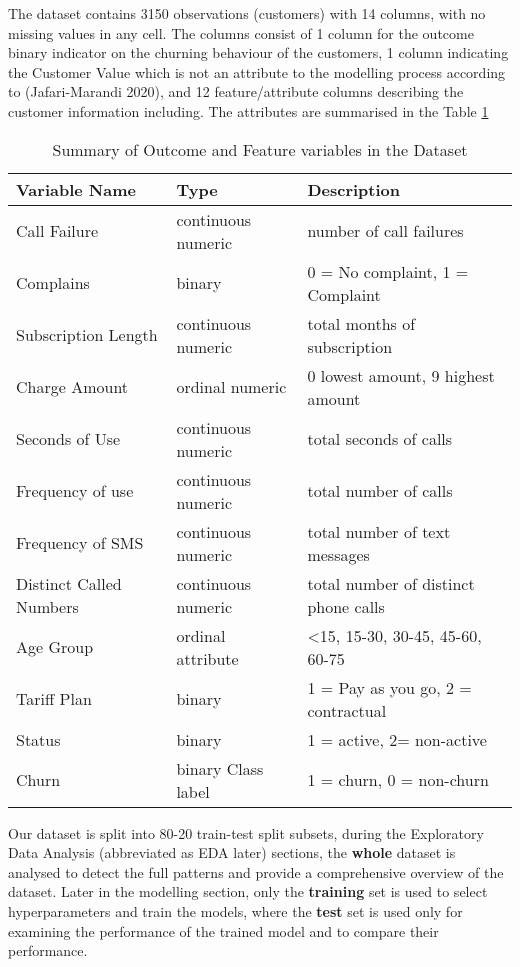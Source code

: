 \documentclass[11pt]{article}
\begin{document}
The dataset contains 3150 observations (customers) with 14 columns, with no missing values in any cell. The columns consist of 1 column for the outcome binary indicator on the churning behaviour of the customers, 1 column indicating the Customer Value which is not an attribute to the modelling process according to (Jafari-Marandi 2020), and 12 feature/attribute columns describing the customer information including. The attributes are summarised in the Table \ref{table:features}

\begin{table}[h]
    \centering
    \begin{tabular}{@{}lll@{}}
    \toprule
    \textbf{Variable Name} & \textbf{Type} & \textbf{Description} \\ 
    \midrule
    Call Failure & continuous numeric & number of call failures \\
    Complains & binary & 0 = No complaint, 1 = Complaint \\
    Subscription Length & continuous numeric & total months of subscription \\
    Charge Amount & ordinal numeric & 0 lowest amount, 9 highest amount \\
    Seconds of Use & continuous numeric & total seconds of calls \\
    Frequency of use & continuous numeric & total number of calls \\
    Frequency of SMS & continuous numeric & total number of text messages \\
    Distinct Called Numbers & continuous numeric & total number of distinct phone calls \\
    Age Group & ordinal attribute & <15, 15-30, 30-45, 45-60, 60-75 \\
    Tariff Plan & binary & 1 = Pay as you go, 2 = contractual \\
    Status & binary & 1 = active, 2= non-active \\
    Churn & binary Class label & 1 = churn, 0 = non-churn \\
    \bottomrule
    \end{tabular}
    \caption{Summary of Outcome and Feature variables in the Dataset}
    \label{table:features}
\end{table}

Our dataset is split into 80-20 train-test split subsets, during the Exploratory Data Analysis (abbreviated as EDA later) sections, the \textbf{whole} dataset is analysed to detect the full patterns and provide a comprehensive overview of the dataset. Later in the modelling section, only the \textbf{training} set is used to select hyperparameters and train the models, where the \textbf{test} set is used only for examining the performance of the trained model and to compare their performance. 
\end{document}
